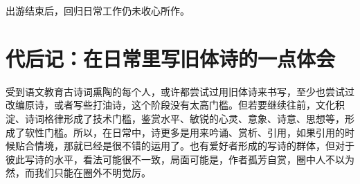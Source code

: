 \documentclass{article}
\newenvironment{poem}[3]{
\begin{minipage}{\textwidth}
\begin{pinyinscope}\begin{center}\Large\linespread{1.4}\selectfont #2\end{center}\end{pinyinscope}
\begin{pinyinscope}
	\begin{center}
	\Large\linespread{1.4}\rmfamily\selectfont #3
}{\end{center}
\end{pinyinscope}
\end{minipage}
}
\begin{document}
出游结束后，回归日常工作仍未收心所作。





















\section{代后记：在日常里写旧体诗的一点体会}

受到语文教育古诗词熏陶的每个人，或许都尝试过用旧体诗来书写，至少也尝试过改编原诗，或者写些打油诗，这个阶段没有太高门槛。但若要继续往前，文化积淀、诗词格律形成了技术门槛，鉴赏水平、敏锐的心灵、意象、诗意、思想等，形成了软性门槛。所以，在日常中，诗更多是用来吟诵、赏析、引用，如果引用的时候贴合情境，那就已经是很不错的运用了。也有爱好者形成的写诗的群体，但对于彼此写诗的水平，看法可能很不一致，局面可能是，作者孤芳自赏，圈中人不以为然，而我们只能在圈外不明觉厉。
\end{document}
